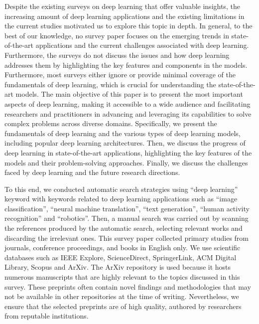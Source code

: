 \documentclass[preprint,12pt]{elsarticle}
\begin{document}
Despite the existing surveys on deep learning that offer valuable insights, the increasing amount of deep learning applications and the existing limitations in the current studies motivated us to explore this topic in depth. In general, to the best of our knowledge, no survey paper focuses on the emerging trends in state-of-the-art applications and the current challenges associated with deep learning. Furthermore, the surveys do not discuss the issues and how deep learning addresses them by highlighting the key features and components in the models. Furthermore, most surveys either ignore or provide minimal coverage of the fundamentals of deep learning, which is crucial for understanding the state-of-the-art models. The main objective of this paper is to present the most important aspects of deep learning, making it accessible to a wide audience and facilitating researchers and practitioners in advancing and leveraging its capabilities to solve complex problems across diverse domains. Specifically, we present the fundamentals of deep learning and the various types of deep learning models, including popular deep learning architectures. Then, we discuss the progress of deep learning in state-of-the-art applications, highlighting the key features of the models and their problem-solving approaches. Finally, we discuss the challenges faced by deep learning and the future research directions.

To this end, we conducted automatic search strategies using ``deep learning'' keyword with keywords related to deep learning applications such as ``image classification'', ``neural machine translation'', ``text generation'', ``human activity recognition'' and ``robotics''. Then, a manual search was carried out by scanning the references produced by the automatic search, selecting relevant works and discarding the irrelevant ones. This survey paper collected primary studies from journals, conference proceedings, and books in English only. We use scientific databases such as IEEE Explore, ScienceDirect, SpringerLink, ACM Digital Library, Scopus and ArXiv. The ArXiv repository is used because it hosts numerous manuscripts that are highly relevant to the topics discussed in this survey. These preprints often contain novel findings and methodologies that may not be available in other repositories at the time of writing. Nevertheless, we ensure that the selected preprints are of high quality, authored by researchers from reputable institutions.
\end{document}
